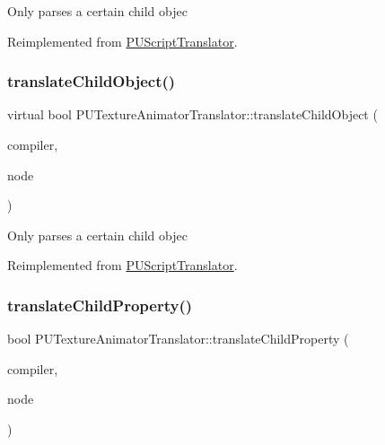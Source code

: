 Only parses a certain child objec 

Reimplemented from \hyperlink{classPUScriptTranslator_ab587d01348ae3e678cb700c719b2b113}{P\+U\+Script\+Translator}.

\mbox{\label{classPUTextureAnimatorTranslator_ad16b7551c63fa2810daa385bf4083dba}} 
\subsubsection{\texorpdfstring{translate\+Child\+Object()}{translateChildObject()}\hspace{0.1cm}{\footnotesize\ttfamily [2/2]}}
{\footnotesize\ttfamily virtual bool P\+U\+Texture\+Animator\+Translator\+::translate\+Child\+Object (\begin{DoxyParamCaption}\item[{\hyperlink{classPUScriptCompiler}{P\+U\+Script\+Compiler} $\ast$}]{compiler,  }\item[{\hyperlink{classPUAbstractNode}{P\+U\+Abstract\+Node} $\ast$}]{node }\end{DoxyParamCaption})\hspace{0.3cm}{\ttfamily [virtual]}}

Only parses a certain child objec 

Reimplemented from \hyperlink{classPUScriptTranslator_ab587d01348ae3e678cb700c719b2b113}{P\+U\+Script\+Translator}.

\mbox{\label{classPUTextureAnimatorTranslator_ae1e941014e7aef7397e11a0b46a4419a}} 
\subsubsection{\texorpdfstring{translate\+Child\+Property()}{translateChildProperty()}\hspace{0.1cm}{\footnotesize\ttfamily [1/2]}}
{\footnotesize\ttfamily bool P\+U\+Texture\+Animator\+Translator\+::translate\+Child\+Property (\begin{DoxyParamCaption}\item[{\hyperlink{classPUScriptCompiler}{P\+U\+Script\+Compiler} $\ast$}]{compiler,  }\item[{\hyperlink{classPUAbstractNode}{P\+U\+Abstract\+Node} $\ast$}]{node }\end{DoxyParamCaption})\hspace{0.3cm}{\ttfamily [virtual]}}

